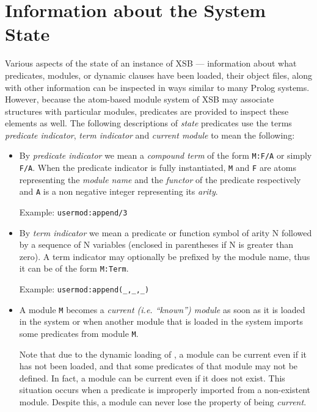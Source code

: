 \section{Information about the System State} \label{State}
 

Various aspects of the state of an instance of XSB --- information
about what predicates, modules, or dynamic clauses have been loaded,
their object files, along with other information can be inspected in
ways similar to many Prolog systems.  However, because the atom-based
module system of XSB may associate structures with particular modules,
predicates are provided to inspect these elements as well.  The
following descriptions of {\em state} predicates use the terms {\em
predicate indicator}, {\em term indicator} and {\em current module} to
mean the following:
\begin{itemize}
\item By {\em predicate indicator}  we mean a
      {\em compound term} of the form {\tt M:F/A} or simply {\tt F/A}.
      When the predicate indicator is fully instantiated, {\tt M} and {\tt F}
      are atoms representing the {\em module name} and the {\em functor} 
      of the predicate respectively and {\tt A} is a non negative integer 
      representing its {\em arity}.

      Example: {\tt usermod:append/3}
\item By {\em term indicator}  we mean a predicate or
      function symbol of arity N followed by a sequence of N variables
      (enclosed in parentheses if N is greater than zero).  A term indicator
      may optionally be prefixed by the module name, thus it can be of the
      form {\tt M:Term}.

      Example: {\tt usermod:append(\_,\_,\_)}
\item A module {\tt M} becomes a {\em current (i.e. ``known'') module} as
      soon as it is loaded in the system or when another module that is
      loaded in the system imports some predicates from module {\tt M}.

      Note that due to the dynamic loading of \ourprolog, a module can be 
      current even if it has not been loaded, and that some predicates of 
      that module may not be defined. In fact, a module can be current even
      if it does not exist.  This situation occurs when a predicate is 
      improperly imported from a non-existent module.  Despite this, 
      a module can never lose the property of being {\em current}.
\end{itemize}


